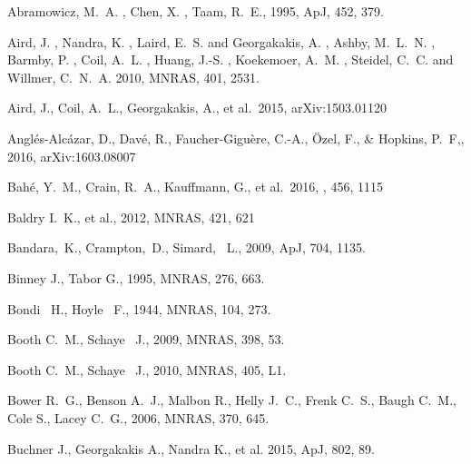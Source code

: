 \documentclass[a4paper,fleqn,usenatbib,letter]{mnras}
\begin{document}
\begin{thebibliography}{99}
{Abramowicz}, M.~A. , {Chen}, X. , {Taam}, R.~E., 1995, ApJ, 452, 379.

{Aird}, J. , {Nandra}, K. , {Laird}, E.~S. and {Georgakakis}, A. , 
{Ashby}, M.~L.~N. , {Barmby}, P. , {Coil}, A.~L. , {Huang}, J.-S. , 
{Koekemoer}, A.~M. , {Steidel}, C.~C. and {Willmer}, C.~N.~A.
2010, MNRAS, 401, 2531.

Aird, J., Coil, A.~L., Georgakakis, A., et al.\ 2015, arXiv:1503.01120

Angl{\'e}s-Alc{\'a}zar, D., Dav{\'e}, R., Faucher-Gigu{\`e}re, C.-A., {\"O}zel, F., \& Hopkins, P.~F,, 2016, arXiv:1603.08007 

Bah{\'e}, Y.~M., Crain, R.~A., Kauffmann, G., et al.\ 2016, \mnras, 456, 1115 
 
 Baldry I.~K., et al., 2012, MNRAS, 421, 621

Bandara,~K., Crampton,~D., Simard, ~L., 2009, ApJ, 704, 1135. 

Binney J., Tabor G., 1995, MNRAS, 276, 663. 

Bondi ~H., Hoyle ~F., 1944, MNRAS, 104, 273.

Booth C.~M., Schaye ~J., 2009, MNRAS, 398, 53.

Booth C.~M., Schaye ~J., 2010, MNRAS, 405, L1.




 Bower R.~G.,
Benson A.~J., Malbon R., Helly J.~C., Frenk C.~S., Baugh C.~M., Cole S., Lacey
C.~G., 2006, MNRAS, 370, 645. 



Buchner J., Georgakakis A., Nandra K., et al. 2015, ApJ, 802, 89. 



\end{thebibliography}
\end{document}
